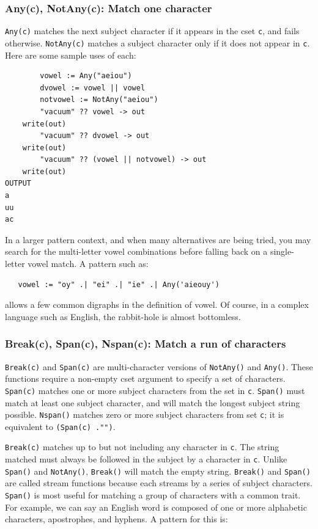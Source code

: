 \documentclass[letterpaper,12pt]{article}
\begin{document}
\subsubsection{Any(c), NotAny(c): Match one character}

{\tt Any(c)} matches the next subject character if it appears in the cset
{\tt c}, and fails otherwise. {\tt NotAny(c)} matches a subject
character only if it does not appear in {\tt c}. Here are some sample
uses of each:

\begin{verbatim}
        vowel := Any("aeiou")
        dvowel := vowel || vowel
        notvowel := NotAny("aeiou")
        "vacuum" ?? vowel -> out
	write(out)
        "vacuum" ?? dvowel -> out
	write(out)
        "vacuum" ?? (vowel || notvowel) -> out
	write(out)
OUTPUT
a
uu
ac
\end{verbatim}

In a larger pattern context, and when many alternatives are being
tried, you may search for the multi-letter vowel combinations before
falling back on a single-letter vowel match. A pattern such as:

\begin{verbatim}
   vowel := "oy" .| "ei" .| "ie" .| Any('aieouy')
\end{verbatim}

\noindent
allows a few common digraphs in the definition of vowel.  Of course, in
a complex language such as English, the rabbit-hole is almost bottomless.


\subsubsection{Break(c), Span(c), Nspan(c): Match a run of characters}

{\tt Break(c)} and {\tt Span(c)} are multi-character versions of
{\tt NotAny()} and {\tt Any()}.  These functions
require a non-empty cset argument to specify a set of characters.
{\tt Span(c)} matches one or more subject characters from the set in {\tt c}.
{\tt Span()} must match at least one subject character, and will match
the longest subject string possible.  {\tt Nspan()} matches zero or more
subject characters from set {\tt c}; it is equivalent to
{\tt (Span(c) .\textbar "")}.

{\tt Break(c)} matches up to but not including
any character in {\tt c}. The string matched must always be followed in the
subject by a character in {\tt c}. Unlike {\tt Span()} and {\tt NotAny()},
{\tt Break()}
will match the empty string.  {\tt Break()} and {\tt Span()} are called stream
functions because each streams by a series of subject
characters. {\tt Span()} is most useful for matching a group of characters
with a common trait. For example, we can say an English word is
composed of one or more alphabetic characters, apostrophes, and
hyphens. A pattern for this is:
\end{document}
